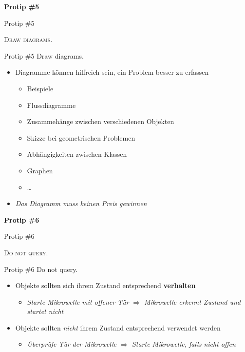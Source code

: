 \documentclass[18pt]{beamer}
\begin{document}
\begin{frame}{\quad}
    \center
    \Huge{\textbf{Protip \#5}}
\end{frame}

\begin{frame}{Protip \#5}
    \begin{block}{}
        \center
        \textsc{Draw diagrams.}
    \end{block}
\end{frame}

\begin{frame}{Protip \#5 Draw diagrams.}
    \begin{itemize}
        \item Diagramme können hilfreich sein, ein Problem besser zu erfassen
        \begin{itemize}
            \item Beispiele
            \item Flussdiagramme
            \item Zusammehänge zwischen verschiedenen Objekten
            \item Skizze bei geometrischen Problemen
            \item Abhängigkeiten zwischen Klassen
            \item Graphen
            \item \dots
        \end{itemize}
        \item \textit{Das Diagramm muss keinen Preis gewinnen}
    \end{itemize}
\end{frame}

\begin{frame}{\quad}
    \center
    \Huge{\textbf{Protip \#6}}
\end{frame}

\begin{frame}{Protip \#6}
    \begin{block}{}
        \center
        \textsc{Do not query.}
    \end{block}
\end{frame}

\begin{frame}{Protip \#6 Do not query.}
    \begin{itemize}
        \item Objekte sollten sich ihrem Zustand entsprechend \textbf{verhalten}
        \begin{itemize}
            \item \textit{Starte Mikrowelle mit offener Tür $\Rightarrow$ Mikrowelle erkennt Zustand und startet nicht}
        \end{itemize}
        \vspace{.2in}
        \item Objekte sollten \textit{nicht} ihrem Zustand entsprechend verwendet werden
        \begin{itemize}
            \item \textit{Überprüfe Tür der Mikrowelle $\Rightarrow$ Starte Mikrowelle, falls nicht offen}
        \end{itemize}
    \end{itemize}
\end{frame}
\end{document}
